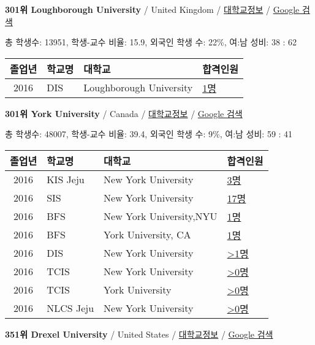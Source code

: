 \documentclass[13pt,]{article}
\begin{document}
\textbf{301위 Loughborough University} / United Kingdom /
\href{https://www.timeshighereducation.com/world-university-rankings/loughborough-university?ranking-dataset=589595}{대학교정보}
/ \href{http://www.google.com/search?q=Loughborough+University}{Google
검색}

총 학생수: 13951, 학생-교수 비율: 15.9, 외국인 학생 수: 22\%, 여:남
성비: 38 : 62

\begin{longtable}[]{@{}clll@{}}
\toprule
졸업년 & 학교명 & 대학교 & 합격인원\tabularnewline
\midrule
\endhead
2016 & DIS & Loughborough University &
\href{http://cafe.naver.com/assarabia/11591}{1명}\tabularnewline
\bottomrule
\end{longtable}

\textbf{301위 York University} / Canada /
\href{https://www.timeshighereducation.com/world-university-rankings/york-university?ranking-dataset=589595}{대학교정보}
/ \href{http://www.google.com/search?q=York+University}{Google 검색}

총 학생수: 48007, 학생-교수 비율: 39.4, 외국인 학생 수: 9\%, 여:남 성비:
59 : 41

\begin{longtable}[]{@{}clll@{}}
\toprule
졸업년 & 학교명 & 대학교 & 합격인원\tabularnewline
\midrule
\endhead
2016 & KIS Jeju & New York University &
\href{http://cafe.naver.com/assarabia/11596}{3명}\tabularnewline
2016 & SIS & New York University &
\href{http://cafe.naver.com/assarabia/11589}{17명}\tabularnewline
2016 & BFS & New York University,NYU &
\href{http://cafe.naver.com/assarabia/11597}{1명}\tabularnewline
2016 & BFS & York University, CA &
\href{http://cafe.naver.com/assarabia/11597}{1명}\tabularnewline
2016 & DIS & New York University &
\href{http://cafe.naver.com/assarabia/11591}{\textgreater{}1명}\tabularnewline
2016 & TCIS & New York University &
\href{http://cafe.naver.com/assarabia/11598}{\textgreater{}0명}\tabularnewline
2016 & TCIS & York University &
\href{http://cafe.naver.com/assarabia/11598}{\textgreater{}0명}\tabularnewline
2016 & NLCS Jeju & New York University &
\href{http://cafe.naver.com/assarabia/11592}{\textgreater{}0명}\tabularnewline
\bottomrule
\end{longtable}

\textbf{351위 Drexel University} / United States /
\href{https://www.timeshighereducation.com/world-university-rankings/drexel-university?ranking-dataset=589595}{대학교정보}
/ \href{http://www.google.com/search?q=Drexel+University}{Google 검색}
\end{document}

